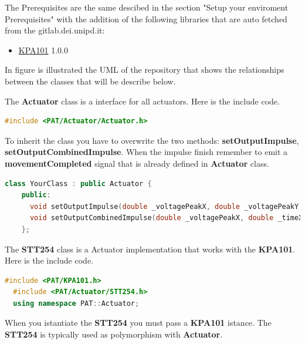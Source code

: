 
The Prerequisites are the same descibed in the section "Setup your enviroment Prerequisites"  with the addition of the following libraries that are auto fetched from the gitlab.dei.unipd.it:

\begin{itemize}
  \tightlist
  \item
        \href{https://gitlab.dei.unipd.it/PAT/KPA101.git}{KPA101} 1.0.0
\end{itemize}


In figure  is illustrated the UML of the repository that shows the relationships between the classes that will be describe below.



The \textbf{Actuator} class is a interface for all actuators. Here is the
include code.

\begin{lstlisting}[language=c++, gobble=2]
  #include <PAT/Actuator/Actuator.h>
\end{lstlisting}

To inherit the class you have to overwrite the two methods:
\textbf{setOutputImpulse}, \textbf{setOutputCombinedImpulse}. When the
impulse finish remember to emit a \textbf{movementCompleted} signal that
is already defined in \textbf{Actuator} class.

\begin{lstlisting}[language=c++, gobble=2]
  class YourClass : public Actuator {
    public:
      void setOutputImpulse(double _voltagePeakX, double _voltagePeakY, double _time_ms) override;
      void setOutputCombinedImpulse(double _voltagePeakX, double _timeX_ms, double _voltagePeakY, double _timeY_ms) override;
    };
\end{lstlisting}


The \textbf{STT254} class is a Actuator implementation that works with
the \textbf{KPA101}. Here is the include code.

\begin{lstlisting}[language=c++, gobble=2]
  #include <PAT/KPA101.h>
  #include <PAT/Actuator/STT254.h>
  using namespace PAT::Actuator;
\end{lstlisting}

When you istantiate the \textbf{STT254} you must pass a \textbf{KPA101}
istance. The \textbf{STT254} is typically used as polymorphism with
\textbf{Actuator}.

